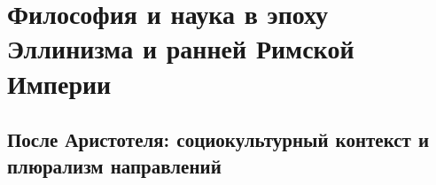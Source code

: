 \section{Философия и наука в эпоху Эллинизма и ранней Римской Империи}

\subsection{После Аристотеля: социокультурный контекст и плюрализм направлений}




